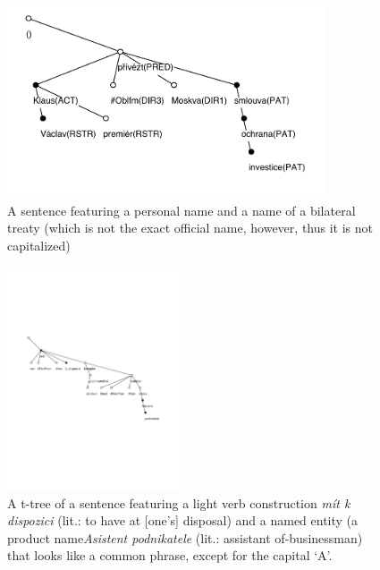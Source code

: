 \begin{figure}[htbp]
   \centerline{\includegraphics[width=3.7in]{images/klaus-a-smlouva.pdf}}
   \caption{A sentence featuring a personal name and a name of a bilateral treaty (which is not the exact official name, however, thus it is not capitalized)}
   \label{fig:klaus}
\end{figure}

\begin{figure}[htbp]
   \centerline{\includegraphics[height=2.6in]{images/as-pod.pdf}}
   \caption{A t-tree of a sentence featuring a light verb construction \emph{mít k dispozici} (lit.: to have at [one's] disposal) and a named entity (a product name\emph{Asistent podnikatele} (lit.: assistant of-businessman) that looks like a common phrase, except for the capital `A'.}
   \label{fig:asistent}
\end{figure}

